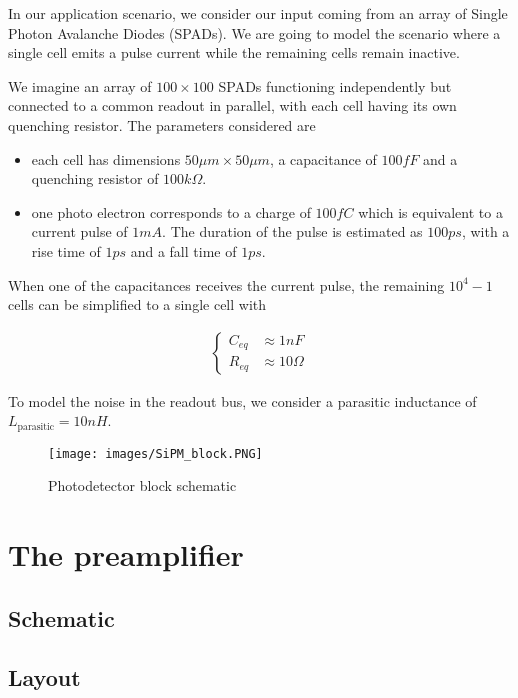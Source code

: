 \documentclass[a4paper,12pt,twoside]{article}
\begin{document}
	In our application scenario, we consider our input coming from an array of Single Photon Avalanche Diodes (SPADs). We are going to model the scenario where a single cell emits a pulse current while the remaining cells remain inactive.
	
	We imagine an array of $100\times100$ SPADs functioning independently but connected to a common readout in parallel, with each cell having its own quenching resistor. The parameters considered are
	
	\begin{itemize}
		\item each cell has dimensions $50\mu m \times 50\mu m$, a capacitance of $100fF$ and a quenching resistor of $100k\Omega$.
		\item one photo electron corresponds to a charge of $100fC$ which is equivalent to a current pulse of $1mA$. The duration of the pulse is estimated as $100ps$, with a rise time of $1ps$ and a fall time of $1ps$.
	\end{itemize}
	
	When one of the capacitances receives the current pulse, the remaining $10^4 - 1$ cells can be simplified to a single cell with
	
	\begin{align}
		\begin{cases}
			C_{eq} &\approx 1nF \\
			R_{eq} &\approx 10\Omega
		\end{cases}
	\end{align}
	
	To model the noise in the readout bus, we consider a parasitic inductance of $L_{\text{parasitic}} = 10nH$.
	
	\begin{figure}[h]
		\centering
		\texttt{[image: images/SiPM\_block.PNG]}
		\caption{Photodetector block schematic}
	\end{figure}
	
	\section{The preamplifier}
	
	\subsection{Schematic}
	
	\subsection{Layout}
	
\end{document}
